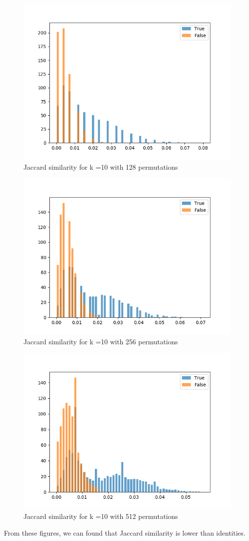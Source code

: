 \documentclass[11pt]{article}
\begin{document}
\begin{figure}[H]
	\centering
	\includegraphics[width = .8\textwidth]{Ecoli_30x_overlap_5000_1000_cutoff_jaccard_k_10_perm_128.png}
	\caption{Jaccard similarity for k =10 with 128 permutations}
	\label{fig1}
\end{figure}

\begin{figure}[H]
	\centering
	\includegraphics[width = .8\textwidth]{Ecoli_30x_overlap_5000_1000_cutoff_jaccard_k_10_perm_256.png}
	\caption{Jaccard similarity for k =10 with 256 permutations}
	\label{fig1}
\end{figure}

\begin{figure}[H]
	\centering
	\includegraphics[width = .8\textwidth]{Ecoli_30x_overlap_5000_1000_cutoff_jaccard_k_10_perm_512.png}
	\caption{Jaccard similarity for k =10 with 512 permutations}
	\label{fig1}
\end{figure}
From these figures, we can found that Jaccard similarity is lower than identities.
\end{document}
